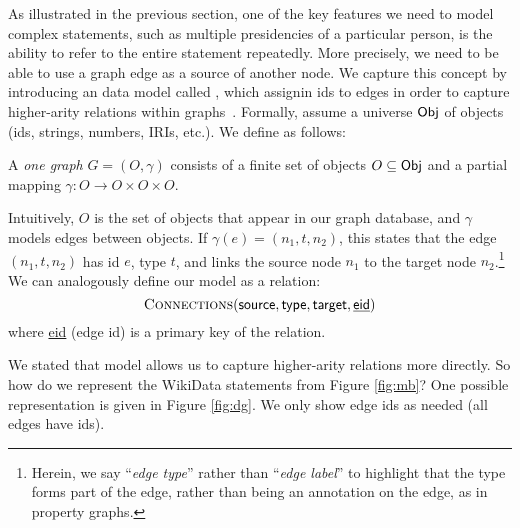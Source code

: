 As illustrated in the previous section, one of the key features we need to model complex statements, such as multiple presidencies of a particular person, is the ability to refer to the entire statement repeatedly. More precisely, we need to be able to use a graph edge as a source of another node. We capture this concept by introducing an data model called \Data, which   assignin ids to edges in order to capture higher-arity relations within graphs~\cite{HernandezHK15,IlievskiGCDYRLL20,LassilaSBBBKKLST}. Formally, assume a universe $\mathsf{Obj}$ of objects (ids, strings, numbers, IRIs, etc.). We define \datas as follows:

\begin{definition}
A \emph{one graph} $G = (O,\gamma)$ consists of a finite set of objects $O\subseteq \mathsf{Obj}$ and a partial mapping $\gamma : O \rightarrow O \times O \times O$. 
\end{definition}

Intuitively, $O$ is the set of objects that appear in our graph database, and $\gamma$ models edges between objects. If $\gamma(e)=(n_1,t,n_2)$, this states that the edge $(n_1,t,n_2)$ has id $e$, type $t$, and links the source node $n_1$ to the target node $n_2$.\footnote{Herein, we say ``\textit{edge type}'' rather than ``\textit{edge label}'' to highlight that the type forms part of the edge, rather than being an annotation on the edge, as in property graphs.} We can analogously define our model as a relation:
\[\textsc{Connections}(\textsf{source},\textsf{type},\textsf{target},\underline{\textsf{eid}}) \]
where \underline{\textsf{eid}} (edge id) is a primary key of the relation. 


We stated that \data model allows us to capture higher-arity relations more directly. So how do we represent the WikiData statements from  Figure \ref{fig:mb}? One possible representation is given in  Figure \ref{fig:dg}. We only show edge ids as needed (all edges have ids). 


